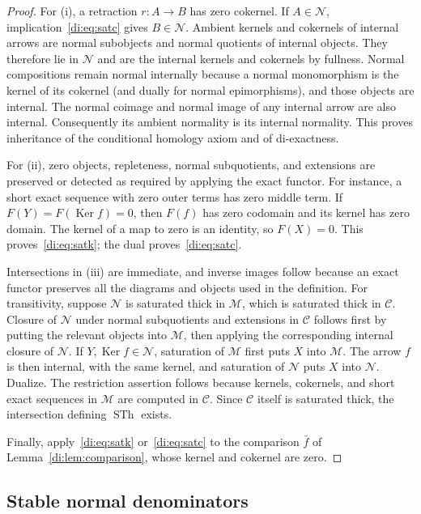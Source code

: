 \documentclass[11pt,reqno,a4paper]{amsart}
\theoremstyle{definition}
\theoremstyle{remark}
\newcommand{\C}{\mathcal{C}}
\newcommand{\M}{\mathcal{M}}
\newcommand{\N}{\mathcal{N}}
\newcommand{\0}{\mathbf{0}}
\renewcommand{\1}{\mathbf{1}}
\DeclareMathOperator{\Ker}{Ker}
\DeclareMathOperator{\SatTh}{STh}
\begin{document}
\begin{proof}
For (i), a retraction $r:A\to B$ has zero cokernel. If $A\in\N$, implication~\eqref{di:eq:satc} gives $B\in\N$. Ambient kernels and cokernels of internal arrows are normal subobjects and normal quotients of internal objects. They therefore lie in $\N$ and are the internal kernels and cokernels by fullness. Normal compositions remain normal internally because a normal monomorphism is the kernel of its cokernel (and dually for normal epimorphisms), and those objects are internal. The normal coimage and normal image of any internal arrow are also internal. Consequently its ambient normality is its internal normality. This proves inheritance of the conditional homology axiom and of di-exactness.

For (ii), zero objects, repleteness, normal subquotients, and extensions are preserved or detected as required by applying the exact functor. For instance, a short exact sequence with zero outer terms has zero middle term. If $F(Y)=F(\Ker f)=0$, then $F(f)$ has zero codomain and its kernel has zero domain. The kernel of a map to zero is an identity, so $F(X)=0$. This proves~\eqref{di:eq:satk}; the dual proves~\eqref{di:eq:satc}.

Intersections in (iii) are immediate, and inverse images follow because an exact functor preserves all the diagrams and objects used in the definition. For transitivity, suppose $\N$ is saturated thick in $\M$, which is saturated thick in $\C$. Closure of $\N$ under normal subquotients and extensions in $\C$ follows first by putting the relevant objects into $\M$, then applying the corresponding internal closure of $\N$. If $Y,\Ker f\in\N$, saturation of $\M$ first puts $X$ into $\M$. The arrow $f$ is then internal, with the same kernel, and saturation of $\N$ puts $X$ into $\N$. Dualize. The restriction assertion follows because kernels, cokernels, and short exact sequences in $\M$ are computed in $\C$. Since $\C$ itself is saturated thick, the intersection defining $\SatTh$ exists.

Finally, apply~\eqref{di:eq:satk} or~\eqref{di:eq:satc} to the comparison $\bar f$ of Lemma~\ref{di:lem:comparison}, whose kernel and cokernel are zero.
\end{proof}

\subsection{Stable normal denominators}\label{di:sec:denominators}
\end{document}
